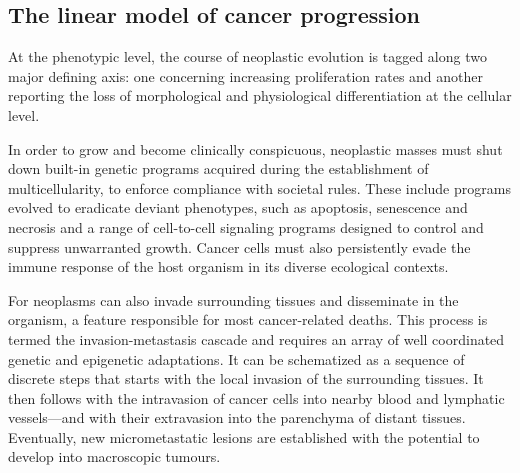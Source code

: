 \subsection{The linear model of cancer progression}
\label{sec:models-cancer-progression}

At the phenotypic level, the course of neoplastic evolution is tagged along two
major defining axis: one concerning increasing proliferation rates and another
reporting the loss of morphological and physiological differentiation at the
cellular level.\cite{tarabichi_systems_2013}


In order to grow and become clinically conspicuous, neoplastic masses
must shut down \mbox{built-in} genetic programs acquired during the
establishment of multicellularity, to enforce compliance with societal
rules.  These include programs evolved to eradicate deviant
phenotypes, such as apoptosis, senescence and necrosis and a range of
\mbox{cell-to-cell} signaling programs designed to control and
suppress unwarranted growth.  Cancer cells must also persistently
evade the immune response of the host organism in its diverse
ecological contexts.

For neoplasms can also invade surrounding tissues and disseminate in the
organism, a feature responsible for most \mbox{cancer-related} deaths.  This
process is termed the \mbox{invasion-metastasis}
cascade\cite{valastyan_tumor_2011} and requires an array of well coordinated
genetic and epigenetic adaptations.  It can be schematized as a sequence of
discrete steps that starts with the local invasion of the surrounding tissues.
It then follows with the intravasion of cancer cells into nearby blood and
lymphatic vessels---and with their extravasion into the parenchyma of distant
tissues.  Eventually, new micrometastatic lesions are established with the
potential to develop into macroscopic tumours.


